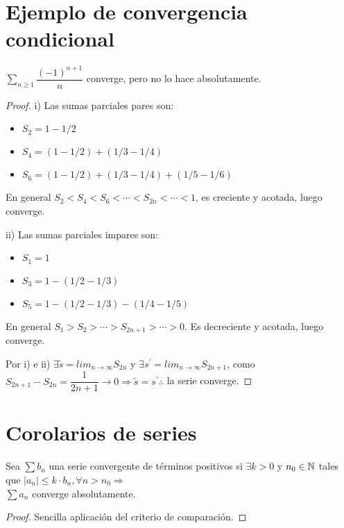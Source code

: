 \section{Ejemplo de convergencia condicional}

\begin{eg}
  $\sum_{n \geq 1} \dfrac{(-1)^{n+1}}{n}$ converge, pero no lo hace absolutamente.
  \begin{proof}
    i) Las sumas parciales pares son:

    \begin{itemize}
      \item $S_2 = 1 - 1/2$
      \item $S_4 = (1 - 1/2) + (1/3 - 1/4)$
      \item $S_6 = (1 - 1/2) + (1/3 - 1/4) + (1/5 - 1/6)$
    \end{itemize}

    En general $S_2 < S_4 < S_6 < \cdots < S_{2n} < \cdots < 1$, es creciente y acotada, luego converge.

    ii) Las sumas parciales impares son:

    \begin{itemize}
      \item $S_1 = 1$
      \item $S_3 = 1 - (1/2 - 1/3)$
      \item $S_5 = 1 - (1/2 - 1/3) - (1/4 - 1/5)$
    \end{itemize}

    En general $S_1 > S_2 > \cdots > S_{2n+1} > \cdots > 0$. Es decreciente y acotada, luego converge.

    Por i) e ii) $\exists \tilde{s} = lim_{n \to \infty} S_{2n}$ y $\exists s^{\prime} = lim_{n \to \infty} S_{2n+1}$, como $S_{2n+1} - S_{2n} = \dfrac{1}{2n+1} \to 0 \Rightarrow \tilde{s} = s^{\prime} \therefore$ la serie converge.
  \end{proof}
\end{eg}

\section{Corolarios de series}

\begin{corollary}
  Sea $\sum b_n$ una serie convergente de términos positivos si $\exists k > 0$ y $n_0 \in \mathbb{N}$ tales que $|a_n| \leq k \cdot b_n, \forall n > n_0 \Rightarrow$ \\
  $\sum a_n$ converge absolutamente.

  \begin{proof}
    Sencilla aplicación del criterio de comparación.
  \end{proof}
\end{corollary}

